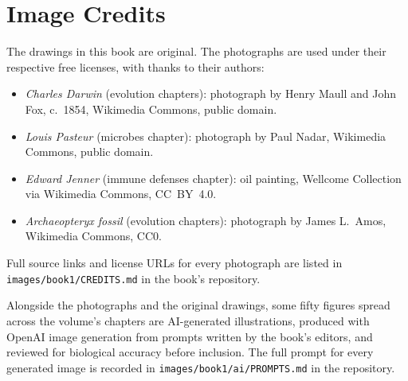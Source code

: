 \chapter*{Image Credits}

The drawings in this book are original. The photographs are used
under their respective free licenses, with thanks to their authors:

\begin{itemize}
  \item \emph{Charles Darwin} (evolution chapters): photograph by
        Henry Maull and John Fox, c.~1854, Wikimedia Commons,
        public domain.
  \item \emph{Louis Pasteur} (microbes chapter): photograph by
        Paul Nadar, Wikimedia Commons, public domain.
  \item \emph{Edward Jenner} (immune defenses chapter): oil
        painting, Wellcome Collection via Wikimedia Commons,
        CC~BY~4.0.
  \item \emph{Archaeopteryx fossil} (evolution chapters):
        photograph by James L.~Amos, Wikimedia Commons, CC0.
\end{itemize}

Full source links and license URLs for every photograph are listed
in \texttt{images/book1/CREDITS.md} in the book's repository.

\bigskip
Alongside the photographs and the original drawings, some fifty
figures spread across the volume's chapters are AI-generated
illustrations, produced with OpenAI image generation from prompts
written by the book's editors, and reviewed for biological accuracy
before inclusion. The full prompt for every generated image is
recorded in \texttt{images/book1/ai/PROMPTS.md} in the repository.
\clearpage
